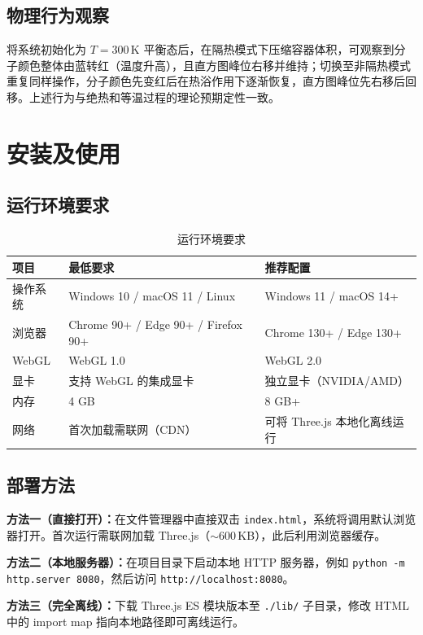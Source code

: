 \documentclass[zihao=-4,a4paper,oneside]{ctexbook}
\newcommand{\chapternb}[1]{%
  \bgroup
  \let\clearpage\relax
  \let\cleardoublepage\relax
  \chapter{#1}%
  \egroup
}
\newcommand{\tabhead}[1]{\textbf{#1}}
\begin{document}
\section{物理行为观察}

将系统初始化为 $T=300\,\text{K}$ 平衡态后，在隔热模式下压缩容器体积，可观察到分子颜色整体由蓝转红（温度升高），且直方图峰位右移并维持；切换至非隔热模式重复同样操作，分子颜色先变红后在热浴作用下逐渐恢复，直方图峰位先右移后回移。上述行为与绝热和等温过程的理论预期定性一致。

\chapternb{安装及使用}

\section{运行环境要求}

\begin{table}[htbp]
\centering
\caption{运行环境要求}
\begin{tabular}{p{3.5cm}p{5cm}p{5cm}}
\toprule
\tabhead{项目} & \tabhead{最低要求} & \tabhead{推荐配置} \\
\midrule
操作系统 & Windows 10 / macOS 11 / Linux & Windows 11 / macOS 14+ \\
浏览器   & Chrome 90+ / Edge 90+ / Firefox 90+ & Chrome 130+ / Edge 130+ \\
WebGL    & WebGL 1.0 & WebGL 2.0 \\
显卡     & 支持 WebGL 的集成显卡 & 独立显卡（NVIDIA/AMD） \\
内存     & 4 GB & 8 GB+ \\
网络     & 首次加载需联网（CDN） & 可将 Three.js 本地化离线运行 \\
\bottomrule
\end{tabular}
\end{table}

\section{部署方法}

\textbf{方法一（直接打开）：}在文件管理器中直接双击 \texttt{index.html}，系统将调用默认浏览器打开。首次运行需联网加载 Three.js（$\sim$600\,KB），此后利用浏览器缓存。

\textbf{方法二（本地服务器）：}在项目目录下启动本地 HTTP 服务器，例如 \texttt{python -m http.server 8080}，然后访问 \texttt{http://localhost:8080}。

\textbf{方法三（完全离线）：}下载 Three.js ES 模块版本至 \texttt{./lib/} 子目录，修改 HTML 中的 import map 指向本地路径即可离线运行。
\end{document}

